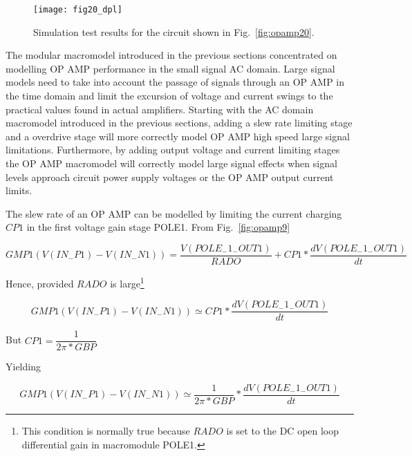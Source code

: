 \begin{figure}
  \centering
  \texttt{[image: fig20\_dpl]}
  \caption{Simulation test results for the circuit shown in Fig.~\ref{fig:opamp20}.}
  \label{fig:opamp21}
\end{figure}




The modular macromodel introduced in the previous sections concentrated on modelling OP AMP performance in the small signal AC domain. Large signal models need to take into account the passage of signals through an OP AMP in the time domain and limit the excursion of voltage and current swings to the practical values found in actual amplifiers. Starting with the AC domain macromodel introduced in the previous sections, adding a slew rate limiting stage and a overdrive stage will more correctly model OP AMP high speed large signal limitations. Furthermore, by adding output voltage and current limiting stages the OP AMP macromodel will correctly model large signal effects when signal levels approach circuit power supply voltages or the OP AMP output current limits. 


The slew rate of an OP AMP can be modelled by limiting the current charging $CP1$ in the first voltage gain stage POLE1. From Fig.~\ref{fig:opamp9}

\begin{equation}
GMP1 \left(  V(IN_{-}P1) - V(IN_{-}N1) \right)  = \dfrac{ V( POLE_{-}1_{-}OUT1 ) } {RADO}+CP1*\dfrac{ dV(POLE_{-}1_{-}OUT1) } {dt} 
\end{equation}

Hence, provided $RADO$ is large\footnote{This condition is normally true because $RADO$ is set to the DC open loop differential gain in macromodule POLE1. }

\begin{equation}
GMP1 \left(  V( IN_{-}P1 ) - V( IN_{-}N1 ) \right)  \simeq  CP1*\dfrac{ dV(POLE_{-}1_{-}OUT1) } {dt}  
\end{equation}


But $ CP1 = \dfrac{1}{2\pi*GBP}$ 


Yielding

\begin{equation}
GMP1 \left(  V(IN_{-}P1) - V(IN_{-}N1) \right)  \simeq \dfrac{1}{2\pi*GBP}*\dfrac{ dV(POLE_{-}1_{-}OUT1) } {dt}  
\end{equation}

